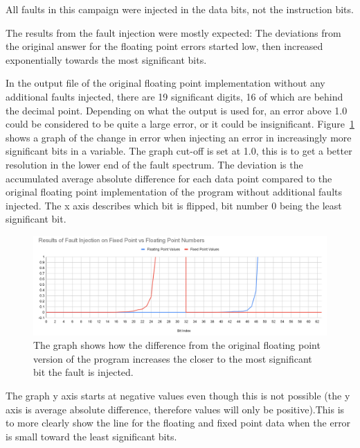 All faults in this campaign were injected in the data bits, not the instruction bits.




The results from the fault injection were mostly expected: The deviations from the original answer for the floating point errors started low, then increased exponentially towards the most significant bits.


In the output file of the original floating point implementation without any additional faults injected, there are 19 significant digits, 16 of which are behind the decimal point. Depending on what the output is used for, an error above 1.0 could be considered to be quite a large error, or it could be insignificant. Figure~\ref{fig:graph_fixed_vs_float_error} shows a graph of the change in error when injecting an error in increasingly more significant bits in a variable. The graph cut-off is set at 1.0, this is to get a better resolution in the lower end of the fault spectrum. The deviation is the accumulated average absolute difference for each data point compared to the original floating point implementation of the program without additional faults injected. The x axis describes which bit is flipped, bit number 0 being the least significant bit.

\begin{figure}[h!]
    \centering
    \includegraphics[width=\linewidth]{Images/graph_float_vs_fixed_fault_injection_results.png}
    \caption{The graph shows how the difference from the original floating point version of the program increases the closer to the most significant bit the fault is injected. }
    \label{fig:graph_fixed_vs_float_error}
\end{figure}


The graph y axis starts at negative values even though this is not possible (the y axis is average absolute difference, therefore values will only be positive).This is to more clearly show the line for the floating and fixed point data when the error is small toward the least significant bits.

